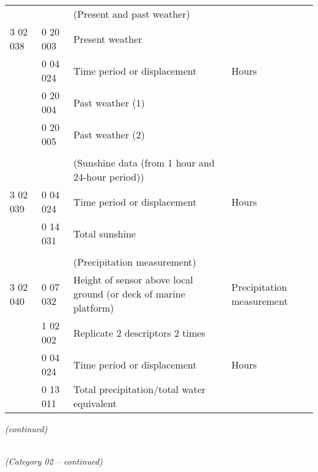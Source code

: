 \begin{longtable}[]{@{}llll@{}}
& & (Present and past weather) &\tabularnewline
3 02 038 & 0 20 003 & Present weather &\tabularnewline
& 0 04 024 & Time period or displacement & Hours\tabularnewline
& 0 20 004 & Past weather (1) &\tabularnewline
& 0 20 005 & Past weather (2) &\tabularnewline
& & &\tabularnewline
& & (Sunshine data (from 1 hour and 24-hour period)) &\tabularnewline
3 02 039 & 0 04 024 & Time period or displacement & Hours\tabularnewline
& 0 14 031 & Total sunshine &\tabularnewline
& & &\tabularnewline
& & (Precipitation measurement) &\tabularnewline
3 02 040 & 0 07 032 & Height of sensor above local ground (or deck of marine platform) & Precipitation measurement\tabularnewline
& 1 02 002 & Replicate 2 descriptors 2 times &\tabularnewline
& 0 04 024 & Time period or displacement & Hours\tabularnewline
& 0 13 011 & Total precipitation/total water equivalent &\tabularnewline
\bottomrule
\end{longtable}

\emph{(continued)}

\emph{\\
(Category 02 -- continued)}

